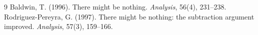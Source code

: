 \documentclass{situationist-preprint}
\begin{document}
\begin{thebibliography}{9}\small
{} Baldwin, T. (1996). There might be nothing. \emph{Analysis}, 56(4), 231--238.
 Rodriguez-Pereyra, G. (1997). There might be nothing: the subtraction argument improved. \emph{Analysis}, 57(3), 159--166.
\end{thebibliography}
\end{document}
